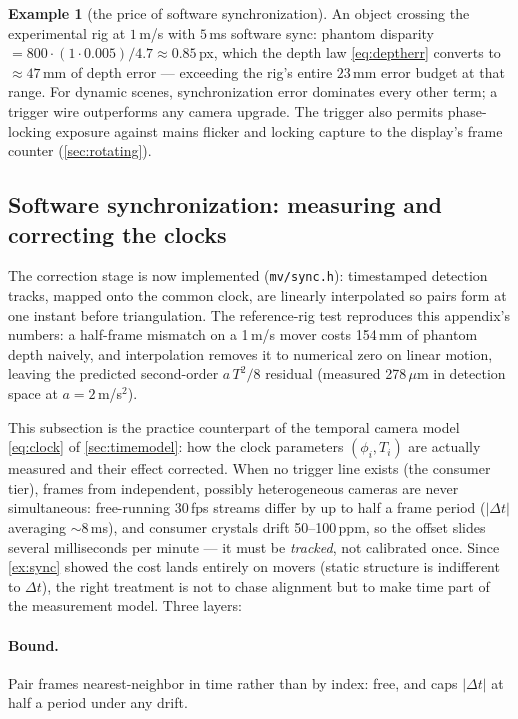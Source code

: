 \documentclass[11pt]{article}
\theoremstyle{definition}
\newtheorem{example}{Example}
\newcommand{\code}[1]{\texttt{#1}}
\begin{document}
\begin{example}[the price of software synchronization]
\label{ex:sync}
An object crossing the experimental rig at $1$\,m/s with $5$\,ms software
sync: phantom disparity $=800\cdot(1\cdot0.005)/4.7\approx0.85$\,px, which
the depth law \eqref{eq:deptherr} converts to
$\approx47$\,mm of depth error --- exceeding the rig's entire
$23$\,mm error budget at that range. For dynamic scenes, synchronization
error dominates every other term; a trigger wire outperforms any camera
upgrade. The trigger also permits phase-locking exposure against mains
flicker and locking capture to the display's frame counter
(\autoref{sec:rotating}).
\end{example}

\subsection{Software synchronization: measuring and correcting the clocks}
\label{sec:softsync}

The correction stage is now implemented (\code{mv/sync.h}):
timestamped detection tracks, mapped onto the common clock, are
linearly interpolated so pairs form at one instant before
triangulation. The reference-rig test reproduces this appendix's
numbers: a half-frame mismatch on a 1\,m/s mover costs 154\,mm of
phantom depth naively, and interpolation removes it to numerical zero
on linear motion, leaving the predicted second-order
\(a\,T^2/8\) residual (measured 278\,\(\mu\)m in detection space
at \(a=2\)\,m/s\(^2\)).

This subsection is the practice counterpart of the temporal camera model
\eqref{eq:clock} of \autoref{sec:timemodel}: how the clock parameters
$(\phi_i, T_i)$ are actually measured and their effect corrected. When no
trigger line exists (the consumer tier), frames from independent,
possibly heterogeneous cameras are never simultaneous: free-running
30\,fps streams differ by up to half a frame period ($|\Delta t|$
averaging $\sim$8\,ms), and consumer crystals drift 50--100\,ppm, so the
offset slides several milliseconds per minute --- it must be
\emph{tracked}, not calibrated once. Since \autoref{ex:sync} showed the
cost lands entirely on movers (static structure is indifferent to
$\Delta t$), the right treatment is not to chase alignment but to make
time part of the measurement model. Three layers:

\paragraph{Bound.} Pair frames nearest-neighbor in time rather than by
index: free, and caps $|\Delta t|$ at half a period under any drift.
\end{document}
